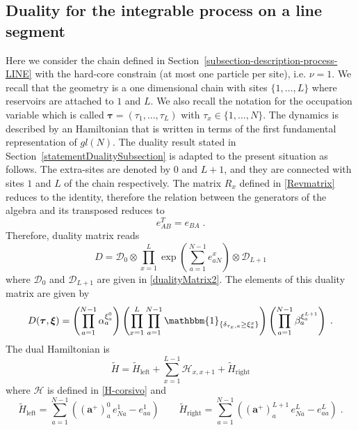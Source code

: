 \documentclass[10pt]{article}
\numberwithin{equation}{section}
\numberwithin{equation}{subsection}
\newcommand{\dt}{\;.}
\begin{document}
\subsection{Duality for the integrable process on a line segment}\label{integrableChain-duality}
Here we consider the chain defined in Section~\ref{subsection-description-process-LINE} with the hard-core constrain {(at most one particle per site)}, i.e. $\nu=1$. 
We recall that the geometry is a one dimensional chain with sites $\{1,\ldots,L\}$ where reservoirs are attached to $1$ and $L$. 
We also recall the notation for the occupation variable which is called $\bm{\tau}=(\tau_1,\ldots,\tau_L)$ with $\tau_x\in\{1,\ldots,N\}$.
The dynamics is described by an Hamiltonian that is written in terms of the first fundamental representation of ${gl}(N)$. The duality result stated in Section~\ref{statementDualitySubsection} is adapted to the present situation as follows. 
The extra-sites are denoted by $0$ and $L+1$, and they are connected with sites $1$ and $L$ of the chain respectively. The matrix $R_{x}$ defined in \eqref{Revmatrix} 
reduces to the identity, therefore the relation between the generators of the algebra and its transposed reduces to
\begin{equation}\label{transpostionPropertyFund}
	e_{AB}^T= e_{BA}\dt
\end{equation}
Therefore, duality matrix reads
\begin{equation}
	D=\mathcal{D}_{0}\otimes\prod_{x=1}^{L}\exp{\left(\sum_{a=1}^{N-1}e_{aN}^{x}\right)}\otimes \mathcal{D}_{L+1}
\end{equation}
where $\mathcal{D}_{0}$ and $\mathcal{D}_{L+1}$ are given in \eqref{dualityMatrix2}. 
The elements of this duality matrix are given by
\begin{equation}\label{ElementsDualityMatrixChain_1}
	D(\bm{\tau},\bm{\xi})=\left(\prod_{a=1}^{N-1}\alpha_{a}^{\xi_{a}^{0}}\right)\left(\prod_{x=1}^{L}\prod_{a=1}^{N-1}\mathbbm{1}_{\{\delta_{\tau_{x},a}\geq \xi_{a}^{x}\}}\right)\left(\prod_{a=1}^{N-1}\beta_{a}^{\xi_{a}^{L+1}}\right)\dt
\end{equation}
The dual Hamiltonian is
\begin{equation}
	\widetilde{H}=\widetilde{H}_{\text{left}}+\sum_{x=1}^{L-1}\mathcal{H}_{x,x+1}+\widetilde{H}_{\text{right}}
\end{equation}
where $\mathcal{H}$ is defined in \eqref{H-corsivo} and 
\begin{equation}\label{boundary-H-dual-chain}
	\widetilde{H}_{\text{left}}=\sum_{a=1}^{N-1}\left((\mathbf{a}^{+})_{a}^{0}\,e_{Na}^{1}-e_{aa}^{1}\right)\qquad 	\widetilde{H}_{\text{right}}=\sum_{a=1}^{N-1}\left((\mathbf{a}^{+})_{a}^{L+1}\,e_{Na}^{L}-e_{aa}^{L}\right)\dt
\end{equation}
\end{document}

